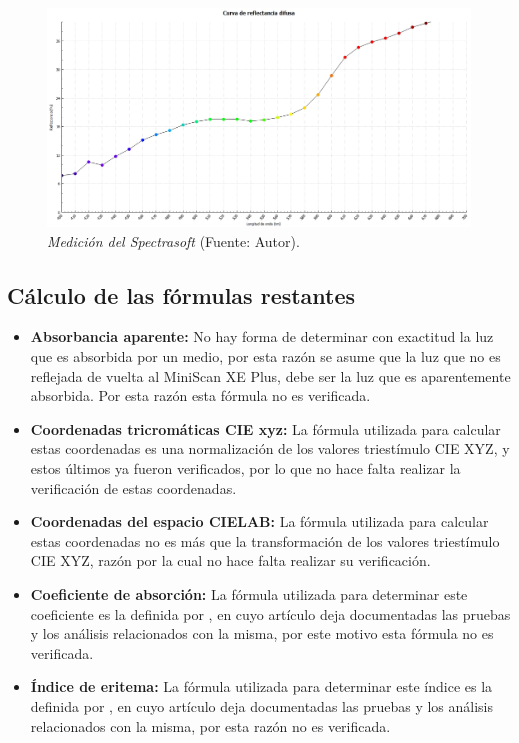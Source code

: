  	\begin{figure}[H]
		\centering
		\includegraphics[scale=0.4]{img/medicion-spectrasoft.jpg}
			\caption[Medici\'{o}n del Spectrasoft]{\textit{Medici\'{o}n del Spectrasoft} (Fuente: Autor).}
	\end{figure}
	
\subsection{C\'{a}lculo de las f\'{o}rmulas restantes}

	\begin{itemize}
		
		\item \textbf{Absorbancia aparente:} No hay forma de determinar con exactitud la luz que es absorbida por un medio, por esta raz\'{o}n se asume que la luz que no es reflejada de vuelta al MiniScan XE Plus, debe ser la luz que es aparentemente absorbida. Por esta raz\'{o}n esta f\'{o}rmula no es verificada.
	
		\item \textbf{Coordenadas tricrom\'{a}ticas CIE xyz:} La f\'{o}rmula utilizada para calcular estas coordenadas es una normalizaci\'{o}n de los valores triest\'{i}mulo CIE XYZ, y estos \'{u}ltimos ya fueron verificados, por lo que no hace falta realizar la verificaci\'{o}n de estas coordenadas.
		
		\item \textbf{Coordenadas del espacio CIELAB:} La f\'{o}rmula utilizada para calcular estas coordenadas no es m\'{a}s que la transformaci\'{o}n de los valores triest\'{i}mulo CIE XYZ, raz\'{o}n por la cual no hace falta realizar su verificaci\'{o}n.
		
		\item \textbf{Coeficiente de absorci\'{o}n:} La f\'{o}rmula utilizada para determinar este coeficiente es la definida por , en cuyo art\'{i}culo deja documentadas las pruebas y los an\'{a}lisis relacionados con la misma, por este motivo esta f\'{o}rmula no es verificada.
		
		\item \textbf{\'{I}ndice de eritema:} La f\'{o}rmula utilizada para determinar este \'{i}ndice es la definida por , en cuyo art\'{i}culo deja documentadas las pruebas y los an\'{a}lisis relacionados con la misma, por esta raz\'{o}n no es verificada.
	\end{itemize}
	
